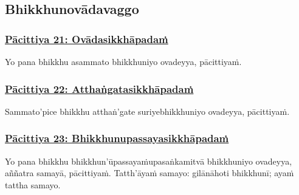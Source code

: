 \subsection{Bhikkhunovādavaggo}

\subsubsection*{\hyperref[exp]{Pācittiya 21: Ovādasikkhāpadaṁ}}
\label{pac21}

Yo pana bhikkhu asammato bhikkhuniyo ovadeyya, pācittiyaṁ.



\subsubsection*{\hyperref[exp22]{Pācittiya 22: Atthaṅgatasikkhāpadaṁ}}
\label{pac22}

Sammato'pi\makeatletter\hyperlink{endnote264-appendix}\makeatother \thinspace ce bhikkhu atthaṅ'gate suriye\makeatletter\hyperlink{endnote265-appendix}\makeatother \thinspace bhikkhuniyo ovadeyya, pācittiyaṁ.



\subsubsection*{\hyperref[exp23]{Pācittiya 23: Bhikkhunupassayasikkhāpadaṁ}}
\label{pac23}

Yo pana bhikkhu bhikkhun'ūpassayaṁ\makeatletter\hyperlink{endnote266-appendix}\makeatother \thinspace upasaṅkamitvā bhikkhuniyo ovadeyya, aññatra samayā, pācittiyaṁ. Tatth'āyaṁ samayo: gilānā\makeatletter\hyperlink{endnote267-appendix}\makeatother \thinspace hoti bhikkhunī; ayaṁ tattha samayo.



